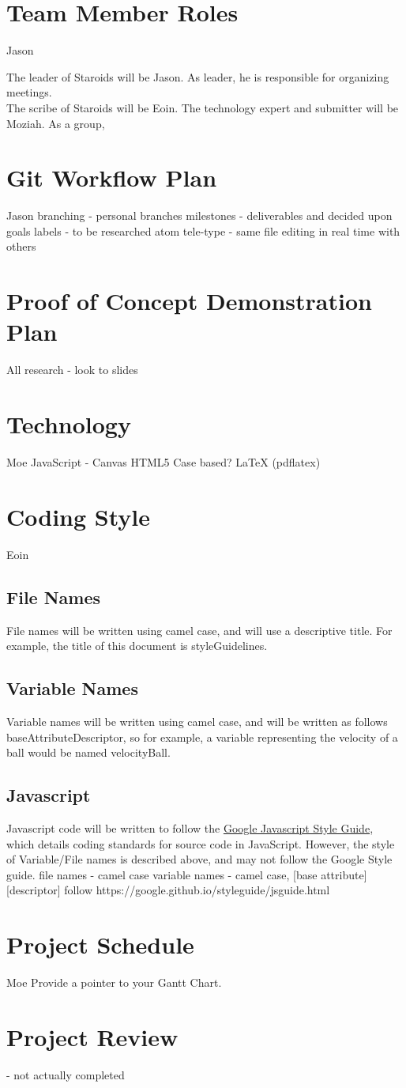 \documentclass{article}
\begin{document}
\section{Team Member Roles}
Jason

The leader of Staroids will be Jason. As leader, he is responsible for organizing meetings.\\
The scribe of Staroids will be Eoin.
The technology expert and submitter will be Moziah.
As a group, 

\section{Git Workflow Plan}
Jason
branching - personal branches
milestones - deliverables and decided upon goals
labels - to be researched
atom tele-type - same file editing in real time with others

\section{Proof of Concept Demonstration Plan}
All
research - look to slides

\section{Technology}
Moe
JavaScript - Canvas
HTML5
Case based?
LaTeX (pdflatex)

\section{Coding Style}
Eoin
\subsection{File Names}
File names will be written using camel case, and will use a descriptive title. For example, the title of this document is styleGuidelines. 
\subsection{Variable Names}
Variable names will be written using camel case, and will be written as follows baseAttributeDescriptor, so for example, a variable representing the velocity of a ball would be named velocityBall.
\subsection{Javascript}
Javascript code will be written to follow the \href{https://google.github.io/styleguide/jsguide.html}{Google Javascript Style Guide}, which details coding standards for source code in JavaScript. However, the style of Variable/File names is described above, and may not follow the Google Style guide.
file names - camel case
variable names - camel case, [base attribute][descriptor]
follow https://google.github.io/styleguide/jsguide.html

\section{Project Schedule}
Moe
Provide a pointer to your Gantt Chart.

\section{Project Review}

- not actually completed
\end{document}
